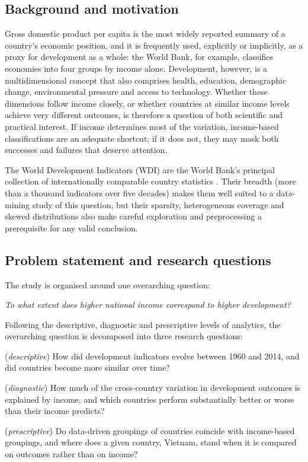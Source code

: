 \documentclass[11pt,a4paper]{article}
\begin{document}
\subsection{Background and motivation}
Gross domestic product per capita is the most widely reported summary of a country's economic position, and it is frequently used, explicitly or implicitly, as a proxy for development as a whole: the World Bank, for example, classifies economies into four groups by income alone. Development, however, is a multidimensional concept that also comprises health, education, demographic change, environmental pressure and access to technology. Whether these dimensions follow income closely, or whether countries at similar income levels achieve very different outcomes, is therefore a question of both scientific and practical interest. If income determines most of the variation, income-based classifications are an adequate shortcut; if it does not, they may mask both successes and failures that deserve attention.

The World Development Indicators (WDI) are the World Bank's principal collection of internationally comparable country statistics \cite{wdi}. Their breadth (more than a thousand indicators over five decades) makes them well suited to a data-mining study of this question, but their sparsity, heterogeneous coverage and skewed distributions also make careful exploration and preprocessing a prerequisite for any valid conclusion.

\subsection{Problem statement and research questions}
The study is organised around one overarching question:

\begin{center}\large\itshape To what extent does higher national income correspond to higher development?\end{center}

Following the descriptive, diagnostic and prescriptive levels of analytics, the overarching question is decomposed into three research questions:
\begin{description}[leftmargin=1.2cm,style=nextline]
\item[RQ1] (\emph{descriptive}) How did development indicators evolve between 1960 and 2014, and did countries become more similar over time?
\item[RQ2] (\emph{diagnostic}) How much of the cross-country variation in development outcomes is explained by income, and which countries perform substantially better or worse than their income predicts?
\item[RQ3] (\emph{prescriptive}) Do data-driven groupings of countries coincide with income-based groupings, and where does a given country, Vietnam, stand when it is compared on outcomes rather than on income?
\end{description}
\end{document}
